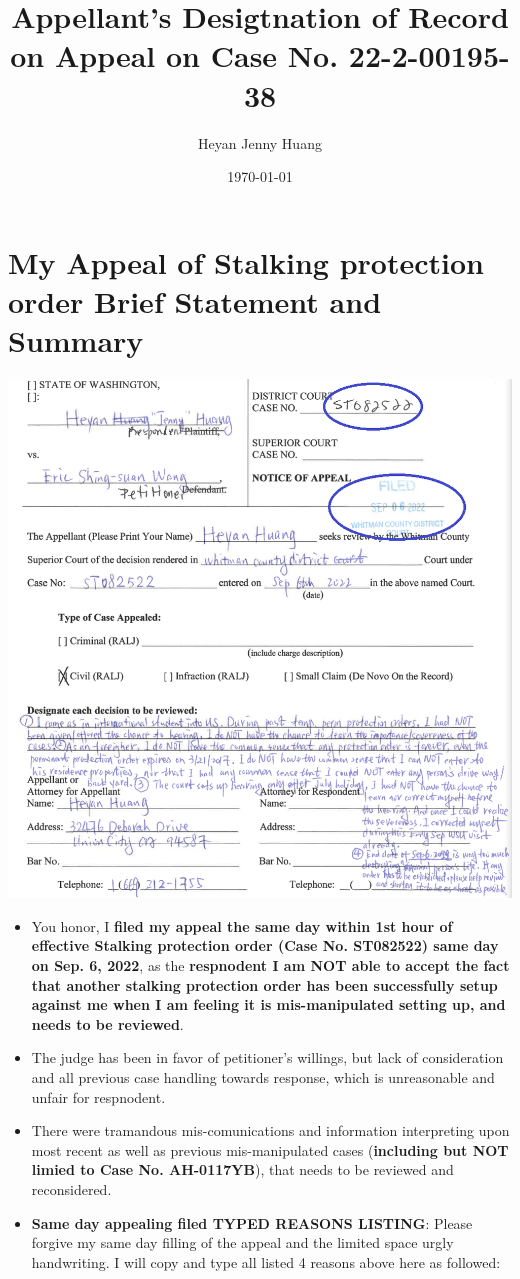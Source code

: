 \documentclass[9pt, b5paper]{article}
\author{Heyan Jenny Huang}
\date{\today}
\title{Appellant's Desigtnation of Record on Appeal on Case No. 22-2-00195-38}
\begin{document}
\maketitle
\tableofcontents


\section{My Appeal of Stalking protection order Brief Statement and Summary}
\label{sec-1}

\includegraphics[width=.9\linewidth]{./pic/dearCousin_20220919_222530.png}
\begin{itemize}
\item You honor, I \textbf{filed my appeal the same day within 1st hour of effective Stalking protection order (Case No. ST082522) same day on Sep. 6, 2022}, as the \textbf{respnodent I am NOT able to accept the fact that another stalking protection order has been successfully setup against me when I am feeling it is mis-manipulated setting up, and needs to be reviewed}.
\item The judge has been in favor of petitioner's willings, but lack of consideration and all previous case handling towards response, which is unreasonable and unfair for respnodent.
\item There were tramandous mis-comunications and information interpreting upon most recent as well as previous mis-manipulated cases (\textbf{including but NOT limied to Case No. AH-0117YB}), that needs to be reviewed and reconsidered.
\item \textbf{Same day appealing filed TYPED REASONS LISTING}: Please forgive my same day filling of the appeal and the limited space urgly handwriting. I will copy and type all listed 4 reasons above here as followed:
\end{itemize}
\end{document}
